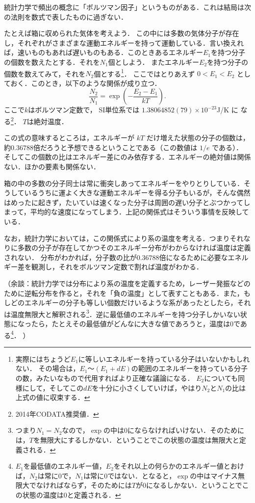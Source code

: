 統計力学で頻出の概念に「ボルツマン因子」というものがある．これは結局は次の法則を数式で表したものに過ぎない．

たとえば箱に収められた気体を考えよう．
この中には多数の気体分子が存在し，それぞれがさまざまな運動エネルギーを持って運動している．言い換えれば，速いものもあれば遅いものもある．このときあるエネルギー$E_1$を持つ分子の個数を数えたとする．それを$N_1$個としよう．
またエネルギー$E_2$を持つ分子の個数を数えてみて，それを$N_2$個とする\footnote{%
実際にはちょうど$E_1$に等しいエネルギーを持っている分子はいないかもしれない．
その場合は，$E_1$～$(E_1+dE)$の範囲のエネルギーを持っている分子の数，みたいなもので代用すればより正確な議論になる．
$E_2$についても同様にして，そしてこの$dE$を十分に小さくしていけば，やはり$N_2$と$N_1$の比は上式の値に収束する．}．
ここではとりあえず $0 < E_1 < E_2$ としておく．このとき，以下のような関係が成り立つ．
%
$$\frac{N_2}{N_1} = \exp\left( -\frac{E_2 - E_1}{k T} \right).$$
%
ここで$k$はボルツマン定数で，
SI単位系では $1.38064852(79) \times 10^{-23}$\xu{}J/K に
なる\footnote{2014年CODATA推奨値．}．
$T$は絶対温度．

この式の意味するところは，エネルギーが $k T$ だけ増えた状態の分子の個数は，約$0.36788$倍だろうと予想できるということである（この数値は $1/e$ である）．
そしてこの個数の比はエネルギー差にのみ依存する．エネルギーの絶対値は関係ない．ほかの要素も関係ない．

箱の中の多数の分子同士は常に衝突しあってエネルギーをやりとりしている．そうしているうちに運よく大きな運動エネルギーを得る分子もいるが，そんな偶然はめったに起きず，たいていは速くなった分子は周囲の遅い分子とぶつかってしまって，平均的な速度になってしまう．上記の関係式はそういう事情を反映している．

なお，統計力学においては，この関係式により系の温度を考える．つまりそれなりに多数の分子が存在してかつそのエネルギー分布がわからなければ温度は定義されない．
分布がわかれば，分子数の比が$0.36788$倍になるために必要なエネルギー差を観測し，それをボルツマン定数で割れば温度がわかる．

（余談：統計力学では分布により系の温度を定義するため，レーザー発振などのために逆転分布を作ると，それを「負の温度」として表すこともある．また，もしどのエネルギーの分子も等しい個数だけいるような系があったとしたら，それは温度無限大と解釈される\footnote{%
つまり$N_1=N_2$なので，$\exp$の中は$0$にならなければいけない．そのためには，$T$を無限大にするしかない．ということでこの状態の温度は無限大と定義される．
}．逆に最低値のエネルギーを持つ分子しかいない状態になったら，たとえその最低値がどんなに大きな値であろうと，温度は$0$である\footnote{%
$E_1$を最低値のエネルギー値，$E_2$をそれ以上の何らかのエネルギー値とおけば，$N_2$は常に$0$で，$N_1$は常に$0$ではない．となると，$\exp$の中はマイナス無限大でなければならず，そのためには$T$が$0$になるしかない．ということでこの状態の温度は$0$と定義される．}．
）

